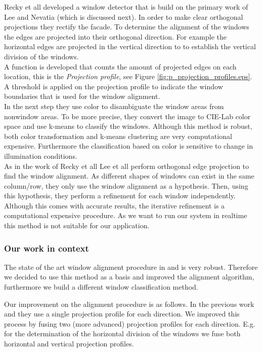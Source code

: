 Recky et all \cite{Recky_kmeans} developed a window detector that is build on
the primary work of Lee and Nevatia \cite{Lee_extraction} (which is discussed
next).  In order to make clear orthogonal projections they rectify the facade. 
To determine the alignment of the windows the edges are projected into their orthogonal direction. 
For example the horizontal edges are projected in the vertical direction to 
to establish the vertical division of the windows.\\
A function is developed that counts the amount of projected edges on each
location, this is the \emph{Projection profile}, see Figure
\ref{fig:p_projection_profiles.eps}.
A threshold is applied on the projection profile to indicate the window
boundaries that is used for the window alignment.\\

In the next step they use color to disambiguate the window areas from nonwindow
areas.  To be more precise, they convert the image to CIE-Lab color space and
use k-means to classify the windows.  Although this method is robust, both color
transformation and k-means clustering are very computational expensive.
Furthermore the classification based on color is sensitive to change in
illumination conditions.\\


As in the work of Recky et all \cite{Recky_kmeans} Lee et all
\cite{Lee_extraction}
perform orthogonal edge projection to find the window alignment.  As different
shapes of windows can exist in the same column/row, they only use the window alignment as
a hypothesis.  Then, using this hypothesis, they perform a refinement for each
window independently. 
Although this comes with accurate results, the iterative refinement is
a computational expensive procedure. As we want to run our system in realtime
this method is not suitable for our application. \\

\subsubsection{Our work in context}
The state of the art window alignment procedure in \cite{Recky_kmeans} and \cite{Lee_extraction}
is very robust.  Therefore we decided to use this method as a basis and improved
the alignment algorithm, furthermore we build a different window classification method.  

Our improvement on the alignment procedure is as follows.
In the previous work \cite{Recky_kmeans} and \cite{Lee_extraction} they use
a single projection profile for each direction.  We improved this 
process by fusing two (more advanced) projection profiles for each direction.
E.g. for the determination of the horizontal division of the windows we fuse both
horizontal and vertical projection profiles.\\

